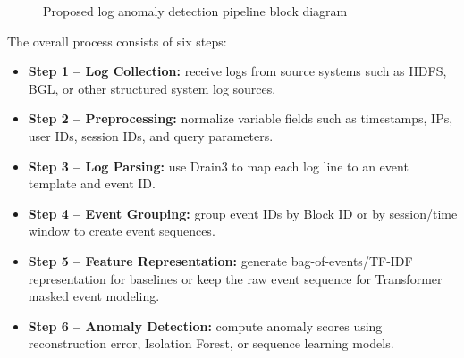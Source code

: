 \documentclass[conference]{IEEEtran}
\begin{document}
\begin{figure}[!t]
\centering
{}
\caption{Proposed log anomaly detection pipeline block diagram}
\label{fig_pipeline}
\end{figure}

The overall process consists of six steps:
\begin{itemize}
    \item \textbf{Step 1 -- Log Collection:} receive logs from source systems such as HDFS, BGL, or other structured system log sources.
    \item \textbf{Step 2 -- Preprocessing:} normalize variable fields such as timestamps, IPs, user IDs, session IDs, and query parameters.
    \item \textbf{Step 3 -- Log Parsing:} use Drain3 to map each log line to an event template and event ID.
    \item \textbf{Step 4 -- Event Grouping:} group event IDs by Block ID or by session/time window to create event sequences.
    \item \textbf{Step 5 -- Feature Representation:} generate bag-of-events/TF-IDF representation for baselines or keep the raw event sequence for Transformer masked event modeling.
    \item \textbf{Step 6 -- Anomaly Detection:} compute anomaly scores using reconstruction error, Isolation Forest, or sequence learning models.
\end{itemize}
\end{document}
